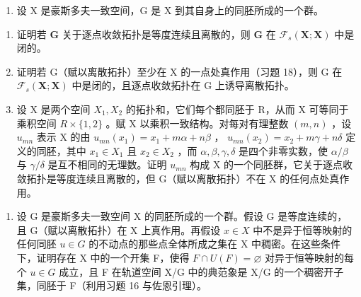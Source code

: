 \begin{enumerate}
\def\labelenumi{\arabic{enumi})}
\setcounter{enumi}{18}
\tightlist
\item
  设 X 是豪斯多夫一致空间，G 是 X 到其自身上的同胚所成的一个群。
\end{enumerate}

\begin{enumerate}
\def\labelenumi{\alph{enumi})}
\item
  证明若 \(\mathbf{G}\) 关于逐点收敛拓扑是等度连续且离散的，则 \(\mathbf{G}\) 在 \(\mathcal{F}_s(\mathbf{X};\mathbf{X})\) 中是闭的。
\item
  证明若 G（赋以离散拓扑）至少在 X 的一点处真作用（习题 18），则 G 在 \(\mathcal{F}_{s}(\mathbf{X};\mathbf{X})\) 中是闭的，且逐点收敛拓扑在 G 上诱导离散拓扑。
\item
  设 X 是两个空间 \(X_{1}, X_{2}\) 的拓扑和，它们每个都同胚于 R，从而 X 可等同于乘积空间 \(R \times \{1, 2\}\) 。赋 X 以乘积一致结构。对每对有理整数 \((m, n)\) ，设 \(u_{mn}\) 表示 X 的由 \(u_{mn}(x_{1}) = x_{1} + m\alpha + n\beta\) ， \(u_{mn}(x_{2}) = x_{2} + m\gamma + n\delta\) 定义的同胚，其中 \(x_{1} \in X_{1}\) 且 \(x_{2} \in X_{2}\) ，而 \(\alpha, \beta, \gamma, \delta\) 是四个非零实数，使 \(\alpha/\beta\) 与 \(\gamma/\delta\) 是互不相同的无理数。证明 \(u_{mn}\) 构成 X 的一个同胚群，它关于逐点收敛拓扑是等度连续且离散的，但 G（赋以离散拓扑）不在 X 的任何点处真作用。
\end{enumerate}

\begin{enumerate}
\def\labelenumi{\arabic{enumi})}
\setcounter{enumi}{19}
\tightlist
\item
  设 G 是豪斯多夫一致空间 X 的同胚所成的一个群。假设 G 是等度连续的，且 G（赋以离散拓扑）在 X 上真作用。再假设 \(x \in X\) 中不是异于恒等映射的任何同胚 \(u \in G\) 的不动点的那些点全体所成之集在 X 中稠密。在这些条件下，证明存在 X 中的一个开集 F，使得 \(F \cap U(F) = \varnothing\) 对异于恒等映射的每个 \(u \in G\) 成立，且 F 在轨道空间 X/G 中的典范象是 X/G 的一个稠密开子集，同胚于 F（利用习题 16 与佐恩引理）。
\end{enumerate}

